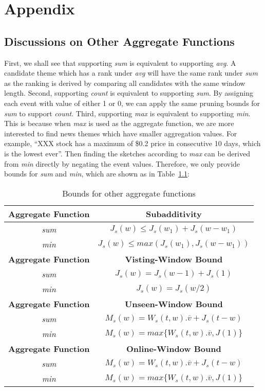 \chapter{Appendix}
\section{Discussions on Other Aggregate Functions}
\label{sec:discussion}
First, we shall see that supporting \emph{sum} is equivalent
to supporting \emph{avg}. 
A candidate theme which has a rank under \emph{avg} will have the 
same rank under \emph{sum} as the ranking is derived by comparing all 
candidates with the same window length. 
%
Second, supporting \emph{count} is equivalent to supporting \emph{sum}. 
By assigning each event with value of either 1 or 0, we can apply the 
same pruning bounds for \emph{sum} to support \emph{count}. 
%
Third, supporting \emph{max} is equivalent to supporting \emph{min}. This is 
because when \emph{max} is used as the aggregate function, we are more interested 
to find news themes which have smaller aggregation values. 
For example, ``XXX stock has a maximum of \$0.2 price
in consecutive 10 days, which is the lowest ever''. Then finding the sketches according to \emph{max} 
can be derived from \emph{min} directly by negating the event values. 
Therefore, we only provide bounds for 
\emph{sum} and \emph{min}, which are shown as in Table~\ref{tbl:agg_bound}:
%
{\renewcommand{\arraystretch}{1.2} 
\begin{table}[h]
\caption{Bounds for other aggregate functions}
\centering
\begin{tabular}{|c|c|}
\hline 
\textbf{Aggregate Function} & \textbf{Subadditivity} \\
\hline 
\emph{sum} & $J_s(w) \leq J_s(w_1) + J_s(w-w_1) $ \\
\emph{min} & $J_s(w) \leq max(J_s(w_1), J_s(w-w_1))$ \\
\hline 
\textbf{Aggregate Function} & \textbf{Visting-Window Bound} \\
\hline 
\emph{sum} & $J_s(w) = J_s(w-1)+J_s(1)$ \\
\emph{min} & $J_s(w) = J_s(w/2)$ \\
\hline 
\textbf{Aggregate Function}& \textbf{Unseen-Window Bound} \\
\hline 
\emph{sum} & $M_s(w) = W_s(t,w).\overline{v} + J_s(t-w)$ \\
\emph{min} & $M_s(w) = max\{W_s(t,w).\overline{v}, J(1)\}$ \\
\hline 
\textbf{Aggregate Function }& \textbf{Online-Window Bound} \\
\hline 
\emph{sum} & $M_s(w) = W_s(t,w).\overline{v} + J_s(t-w)$ \\
\emph{min} & $M_s(w) = max\{W_s(t,w).\overline{v}, J(1)\}$ \\
\hline 
\end{tabular} 
\label{tbl:agg_bound}
\end{table}
}

